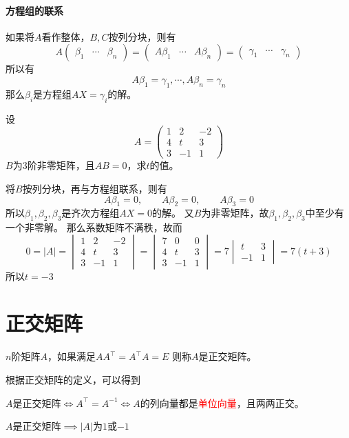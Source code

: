 \paragraph{方程组的联系} 如果将$A$看作整体，$B,C$按列分块，则有
\[
    A
    \begin{pmatrix}
        \beta_1 & \cdots & \beta_n
    \end{pmatrix}
    =
    \begin{pmatrix}
        A\beta_1 & \cdots & A\beta_n
    \end{pmatrix}
    =
    \begin{pmatrix}
        \gamma_1 & \cdots & \gamma_n
    \end{pmatrix}
\]
所以有
\[ A\beta_1 = \gamma_1, \cdots, A\beta_n = \gamma_n \]
那么$\beta_i$是方程组$AX=\gamma_i$的解。

\begin{example}
    设
    \[
        A =
        \begin{pmatrix}
            1 & 2  & -2 \\
            4 & t  & 3  \\
            3 & -1 & 1
        \end{pmatrix}
    \]
    $B$为$3$阶非零矩阵，且$AB=0$，求$t$的值。
\end{example}
\begin{solution}
    将$B$按列分块，再与方程组联系，则有
    \[ A\beta_1 = 0,\qquad A\beta_2 = 0,\qquad A\beta_3 = 0 \]
    所以$\beta_1,\beta_2,\beta_3$是齐次方程组$AX=0$的解。
    又$B$为非零矩阵，故$\beta_1,\beta_2,\beta_3$中至少有一个非零解。
    那么系数矩阵不满秩，故而
    \[
        0 = |A| =
        \begin{vmatrix}
            1 & 2  & -2 \\
            4 & t  & 3  \\
            3 & -1 & 1
        \end{vmatrix}
        =
        \begin{vmatrix}
            7 & 0  & 0 \\
            4 & t  & 3 \\
            3 & -1 & 1
        \end{vmatrix}
        =
        7\begin{vmatrix}
            t  & 3 \\
            -1 & 1
        \end{vmatrix}
        =
        7(t+3)
    \]
    所以$t=-3$
\end{solution}

\section{正交矩阵}
\label{sec:正交矩阵}
\begin{definition}
    $n$阶矩阵$A$，如果满足$AA^\intercal = A^\intercal A = E$
    则称$A$是正交矩阵。
\end{definition}
根据正交矩阵的定义，可以得到
\begin{theorem}
    $A$是正交矩阵$\iff A^\intercal = A^{-1} \iff A$的列向量都是\textcolor{red}{单位向量}，且两两正交。
\end{theorem}
\begin{theorem}
    $A$是正交矩阵$\implies |A|$为$1$或$-1$
\end{theorem}